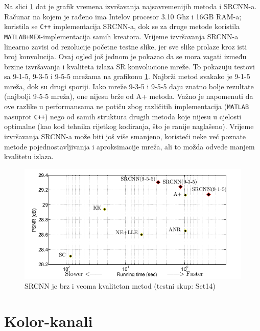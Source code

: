 \documentclass[12pt]{report}
\numberwithin{equation}{section}
\begin{document}
  Na slici \ref{fig:12ogled} dat je grafik vremena izvršavanja najsavremenijih metoda i SRCNN-a. Računar na kojem je rađeno ima Intelov procesor 3.10 Ghz i 16GB RAM-a; koristila se \texttt{C++} implementacija SRCNN-a, dok se za druge metode koristila \texttt{MATLAB+MEX}-implementacija samih kreatora.  
  Vrijeme izvršavanja SRCNN-a linearno zavisi od rezolucije početne testne slike, jer sve slike prolaze kroz isti broj konvolucija. Ovaj ogled još jednom je pokazao da se mora vagati između brzine izvršavanja i kvaliteta izlaza SR konvolucione mreže. To pokazuju testovi sa 9-1-5, 9-3-5 i 9-5-5 mrežama na grafikonu \ref{fig:12ogled}. Najbrži metod svakako je 9-1-5 mreža, dok su drugi sporiji. Iako mreže 9-3-5 i 9-5-5 daju znatno bolje rezultate (najbolji 9-5-5 mreža), one nijesu brže od A+ metoda. Važno je napomenuti da ove razlike u performansama ne potiču zbog različitih implementacija (\texttt{MATLAB} nasuprot \texttt{C++}) nego od samih struktura drugih metoda koje nijesu u cjelosti optimalne (kao kod tehnika rijetkog kodiranja, što je ranije naglašeno). Vrijeme izvršavanja SRCNN-a može biti još više smanjeno, koristeći neke već poznate metode pojednostavljivanja i aproksimacije mreža, ali to možda odvede manjem kvalitetu izlaza. 
  
  
   
\begin{figure}[h]
\includegraphics[width=\textwidth]{SLIKE/figure12}
\centering
\caption{SRCNN je brz i veoma kvalitetan metod (testni skup: Set14)}
\label{fig:12ogled}
\end{figure}
   
   
  \section{Kolor-kanali}
  
\end{document}
